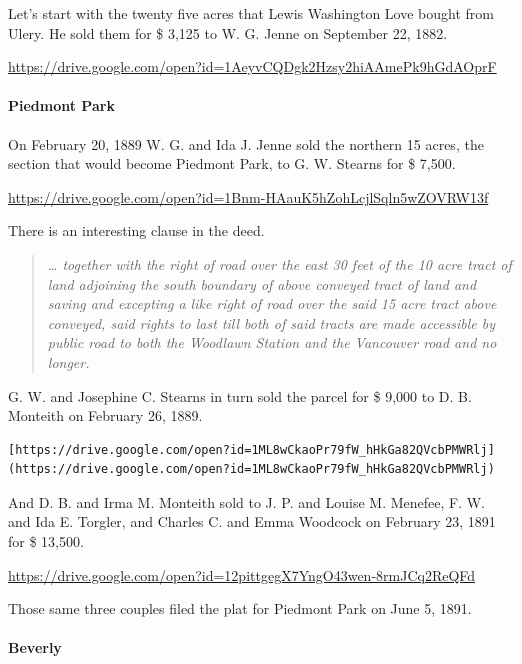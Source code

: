 \documentclass[
  12pt,
]{book}
\begin{document}
Let's start with the twenty five acres that Lewis Washington Love bought from Ulery. He sold them for \$ 3,125 to W. G. Jenne on September 22, 1882.

\url{https://drive.google.com/open?id=1AeyvCQDgk2Hzsy2hiAAmePk9hGdAOprF}

\hypertarget{piedmont-park}{%
\paragraph{Piedmont Park}\label{piedmont-park}}

On February 20, 1889 W. G. and Ida J. Jenne sold the northern 15 acres, the section that would become Piedmont Park, to G. W. Stearns for \$ 7,500.

\url{https://drive.google.com/open?id=1Bnm-HAauK5hZohLcjlSqln5wZOVRW13f}

There is an interesting clause in the deed.

\begin{quote}
\emph{\ldots{} together with the right of road over the east 30 feet of the 10 acre tract of land adjoining the south boundary of above conveyed tract of land and saving and excepting a like right of road over the said 15 acre tract above conveyed, said rights to last till both of said tracts are made accessible by public road to both the Woodlawn Station and the Vancouver road and no longer.}
\end{quote}

G. W. and Josephine C. Stearns in turn sold the parcel for \$ 9,000 to D. B. Monteith on February 26, 1889.

\begin{verbatim}
[https://drive.google.com/open?id=1ML8wCkaoPr79fW_hHkGa82QVcbPMWRlj](https://drive.google.com/open?id=1ML8wCkaoPr79fW_hHkGa82QVcbPMWRlj)
\end{verbatim}

And D. B. and Irma M. Monteith sold to J. P. and Louise M. Menefee, F. W. and Ida E. Torgler, and Charles C. and Emma Woodcock on February 23, 1891 for \$ 13,500.

\url{https://drive.google.com/open?id=12pittgegX7YngO43wen-8rmJCq2ReQFd}

Those same three couples filed the plat for Piedmont Park on June 5, 1891.

\hypertarget{beverly}{%
\paragraph{Beverly}\label{beverly}}
\end{document}
